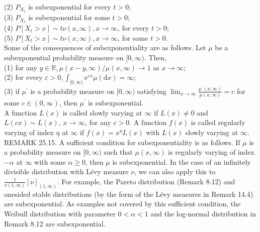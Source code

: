 \documentclass[a4paper,11pt]{article}
\begin{document}
(2) $P_{X_{t}}$ is subexponential for every $t>0$; \\

(3) $P_{X_{t}}$ is subexponential for some $t>0$; \\

(4) $P\left[X_{t}>x\right] \sim t \nu(x, \infty), x \rightarrow \infty$, for every $t>0$; \\

(5) $P\left[X_{t}>x\right] \sim t \nu(x, \infty), x \rightarrow \infty$, for some $t>0$. \\

Some of the consequences of subexponentiality are as follows. Let $\mu$ be a subexponential probability measure on $[0, \infty)$.
Then,\\

(1) for any $y \in \mathbb{R}, \mu(x-y, \infty) / \mu(x, \infty) \rightarrow 1$ as $x \rightarrow \infty$; \\

(2) for every $\varepsilon>0, \int_{[0, \infty)} \mathrm{e}^{\varepsilon x} \mu(\mathrm{d} x)=\infty$; \\

(3) if $\mu^{\prime}$ is a probability measure on $[0, \infty)$ satisfying $\lim _{x \rightarrow \infty}
    \frac{\mu^{\prime}(x, \infty)}{\mu(x, \infty)}=c$ for some $c \in(0, \infty)$, then $\mu^{\prime}$ is subexponential. \\

A function $L(x)$ is called slowly varying at $\infty$ if $L(x) \neq 0$ and $L(c x) \sim L(x)$, $x \rightarrow \infty$,
for any $c>0$. A function $f(x)$ is called regularly varying of index $\eta$ at $\infty$ if $f(x)=x^{\eta} L(x)$ with $L(x)$
slowly varying at $\infty$. \\

REMARK 25.15. A sufficient condition for subexponentiality is as follows. If $\mu$ is a probability
measure on $[0, \infty)$ such that $\mu(x, \infty)$ is regularly varying of index $-\alpha$ at $\infty$
with some $\alpha \geq 0$, then $\mu$ is subexponential. In the case of an infinitely divisible distribution
with Lévy measure $\nu$, we can also apply this to $\frac{1}{\nu(1, \infty)}[\nu]_{(1, \infty)}$. For example,
the Pareto distribution (Remark 8.12) and onesided stable distributions (by the form of the Lévy measures in Remark 14.4)
are subexponential. As examples not covered by this sufficient condition, the Weibull distribution with parameter $0<\alpha<1$
and the log-normal distribution in Remark 8.12 are subexponential.
\end{document}
